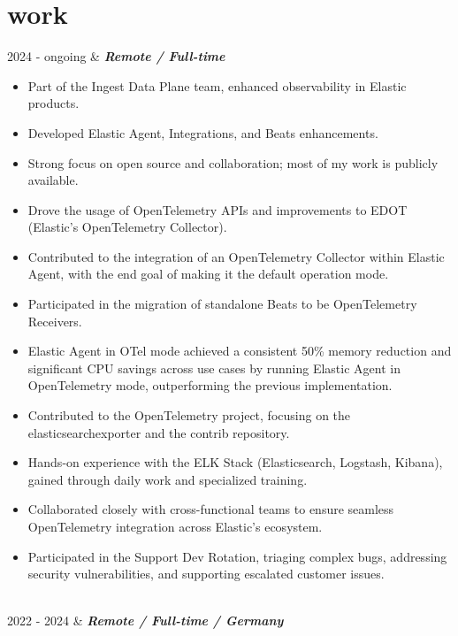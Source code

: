 \documentclass[]{cv-mauri}
\begin{document}
\section*{work}
\begin{tabularcv}
	2024 - ongoing   &   
				\textbf{\textit{Remote / Full-time}}

		\begin{itemize}
			\item Part of the Ingest Data Plane team, enhanced observability in Elastic products.
			\item Developed Elastic Agent, Integrations, and Beats enhancements.
			\item Strong focus on open source and collaboration; most of my work is publicly available.
			\item Drove the usage of OpenTelemetry APIs and improvements to EDOT (Elastic's OpenTelemetry Collector).
			\item Contributed to the integration of an OpenTelemetry Collector within Elastic Agent, with the end goal of making it the default operation mode.
			\item Participated in the migration of standalone Beats to be OpenTelemetry Receivers.
			\item Elastic Agent in OTel mode achieved a consistent 50\% memory reduction and significant CPU savings across use cases by running Elastic Agent in OpenTelemetry mode, outperforming the previous implementation.
			\item Contributed to the OpenTelemetry project, focusing on the elasticsearchexporter and the contrib repository.
			\item Hands-on experience with the ELK Stack (Elasticsearch, Logstash, Kibana), gained through daily work and specialized training.
			\item Collaborated closely with cross-functional teams to ensure seamless OpenTelemetry integration across Elastic's ecosystem.
			\item Participated in the Support Dev Rotation, triaging complex bugs, addressing security vulnerabilities, and supporting escalated customer issues.
		\end{itemize}
				\\[\vspacepar]
	2022 - 2024   &   
					\textbf{\textit{Remote / Full-time / Germany}}


\end{tabularcv}
\end{document}
